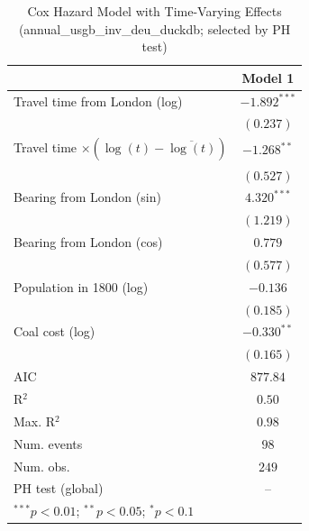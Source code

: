 
\begin{table}
\begin{center}
\begin{tabular}{l c}
\hline
 & Model 1 \\
\hline
Travel time from London (log) & $-1.892^{***}$ \\
 & $(0.237)$ \\
Travel time $\times (\log(t)-\overline{\log(t)})$ & $-1.268^{**}$ \\
 & $(0.527)$ \\
Bearing from London (sin) & $4.320^{***}$ \\
 & $(1.219)$ \\
Bearing from London (cos) & $0.779$ \\
 & $(0.577)$ \\
Population in 1800 (log) & $-0.136$ \\
 & $(0.185)$ \\
Coal cost (log) & $-0.330^{**}$ \\
 & $(0.165)$ \\
\hline
AIC              & $877.84$ \\
R$^2$            & $0.50$ \\
Max. R$^2$       & $0.98$ \\
Num. events      & $98$ \\
Num. obs.        & $249$ \\
PH test (global) & -- \\
\hline
\multicolumn{2}{l}{\scriptsize{$^{***}p<0.01$; $^{**}p<0.05$; $^{*}p<0.1$}}
\end{tabular}
\caption{Cox Hazard Model with Time-Varying Effects (annual\_usgb\_inv\_deu\_duckdb; selected by PH test)}
\label{tab:cox_serious_tv_annual_usgb_inv_deu_duckdb}
\end{center}
\end{table}
